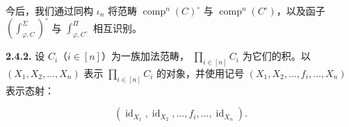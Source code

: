 今后，我们通过同构 $\iota_n$ 将范畴
$\operatorname{comp}^{n}(C)^\circ$ 与
$\operatorname{comp}^{n}(C^\circ)$，以及函子
$\left(\int_{\varphi,C}^{\Sigma}\right)^\circ$ 与
$\int_{\varphi,C^\circ}^{\Pi}$ 相互识别。

\noindent\textbf{2.4.2.}\quad
设 $C_i$（$i\in[n]$）为一族加法范畴，
$\prod_{i\in[n]}C_i$ 为它们的积。以 $(X_1,X_2,\ldots,X_n)$ 表示
$\prod_{i\in[n]}C_i$ 的对象，并使用记号
$(X_1,X_2,\ldots,f_i,\ldots,X_n)$ 表示态射：

\begin{equation*}
  (\operatorname{id}_{X_1},\operatorname{id}_{X_2},\ldots,
  f_i,\ldots,\operatorname{id}_{X_n}).
\end{equation*}
